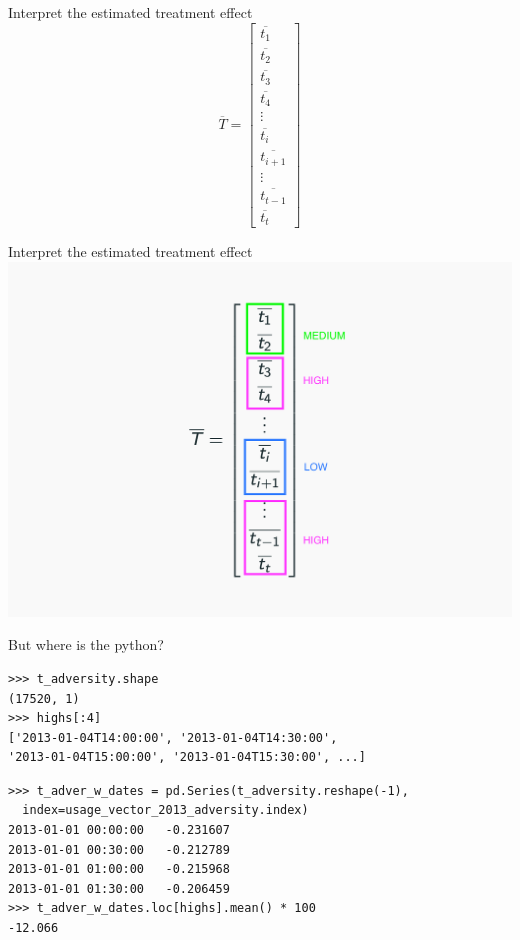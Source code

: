 \documentclass{beamer}
\begin{document}
\begin{frame}{Interpret the estimated treatment effect}
    $$
    \overline{T} = \left[\begin{array}{cccc}
    \overline{t_{1}} \\
    \overline{t_{2}} \\
    \overline{t_{3}} \\
    \overline{t_{4}} \\
    \vdots \\
    \overline{t_{i}} \\
    \overline{t_{i+1}} \\
    \vdots \\
    \overline{t_{t-1}} \\
    \overline{t_{t}}
    \end{array}\right]
    $$
\end{frame}

\begin{frame}{Interpret the estimated treatment effect}
  \centering
  \includegraphics[width=1\textwidth]{images/linear-treatment-hours.png}
\end{frame}

\begin{frame}[fragile]{But where is the python?}
  \begin{verbatim}
>>> t_adversity.shape
(17520, 1)
>>> highs[:4]
['2013-01-04T14:00:00', '2013-01-04T14:30:00', 
'2013-01-04T15:00:00', '2013-01-04T15:30:00', ...]
  \end{verbatim}
  \pause

  \begin{verbatim}
>>> t_adver_w_dates = pd.Series(t_adversity.reshape(-1), 
  index=usage_vector_2013_adversity.index)
2013-01-01 00:00:00   -0.231607
2013-01-01 00:30:00   -0.212789
2013-01-01 01:00:00   -0.215968
2013-01-01 01:30:00   -0.206459
>>> t_adver_w_dates.loc[highs].mean() * 100
-12.066
  \end{verbatim}
\end{frame}
\end{document}

